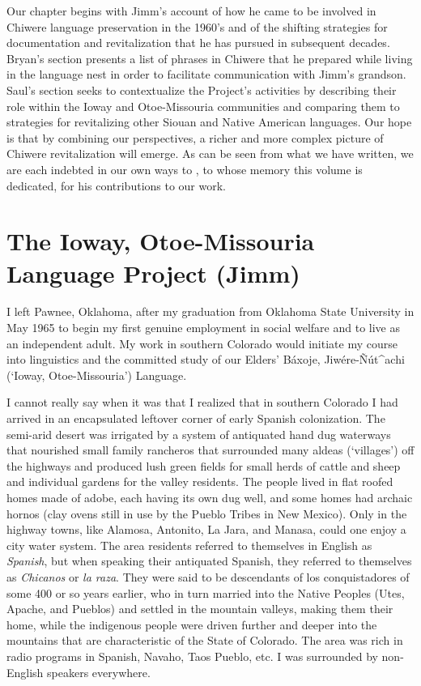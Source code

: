\documentclass[output=paper]{LSP/langsci}
\begin{document}
Our chapter begins with Jimm's account of how he came to be involved in Chiwere language preservation in the 1960's and of the shifting strategies for documentation and revitalization that he has pursued in subsequent decades. Bryan's section presents a list of phrases in Chiwere that he prepared while living in the language nest in order to facilitate communication with Jimm's grandson. Saul's section seeks to contextualize the Project's activities by describing their role within the Ioway and Otoe-Missouria communities and comparing them to strategies for revitalizing other Siouan and Native American languages. Our hope is that by combining our perspectives, a richer and more complex picture of Chiwere revitalization will emerge. As can be seen from what we have written, we are each indebted in our own ways to , to whose memory this volume is dedicated, for his contributions to our work.

\section{The Ioway, Otoe-Missouria Language Project (Jimm)}
I left Pawnee, Oklahoma, after my graduation from Oklahoma State University in May 1965 to begin my first genuine employment in social welfare and to live as an independent adult. My work in southern Colorado would initiate my course into linguistics and the committed study of our Elders' B\'axoje, Jiw\'ere-\~N\'ut\^{ }achi (`Ioway, Otoe-Mis\-sou\-ria') Language.

I cannot really say when it was that I realized that in southern Colorado I had arrived in an encapsulated leftover corner of early Spanish colonization. The semi-arid desert was irrigated by a system of antiquated hand dug waterways that nourished small family rancheros that surrounded many aldeas (`villages') off the highways and produced lush green fields for small herds of cattle and sheep and individual gardens for the valley residents. The people lived in flat roofed homes made of adobe, each having its own dug well, and some homes had archaic hornos (clay ovens still in use by the Pueblo Tribes in New Mexico). Only in the highway towns, like Alamosa, Antonito, La Jara, and Manasa, could one enjoy a city water system. The area residents referred to themselves in English as \emph{Spanish}, but when speaking their antiquated Spanish, they referred to themselves as \emph{Chicanos} or \emph{la raza}. They were said to be descendants of los conquistadores of some 400 or so years earlier, who in turn married into the Native Peoples (Utes, Apache, and Pueblos) and settled in the mountain valleys, making them their home, while the indigenous people were driven further and deeper into the mountains that are characteristic of the State of Colorado. The area was rich in radio programs in Spanish, Navaho, Taos Pueblo, etc. I was surrounded by non-English speakers everywhere.
\end{document}
